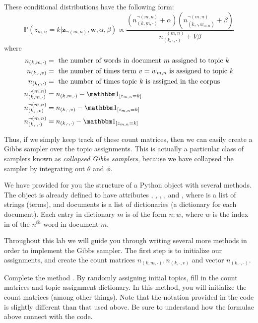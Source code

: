 These conditional distributions have the following form:
\begin{equation*}
\mathbb{P}(z_{m,n} = k | \mathbf{z}_{\neg (m,n)}, \mathbf{w}, \alpha, \beta) \propto \frac{(n_{(k,m,\cdot)}^{\neg (m,n)} + \alpha)(n_{(k, \cdot, w_{m,n})}^{\neg (m,n)} + \beta)}{n_{(k,\cdot,\cdot)}^{\neg (m,n)} + V \beta}
\end{equation*}
where
\begin{align*}
n_{(k,m,\cdot)} & = \mbox{ the number of words in document $m$ assigned to topic $k$} \\
n_{(k,\cdot,v)} & = \mbox{ the number of times term $v = w_{m,n}$ is assigned to topic $k$} \\
n_{(k,\cdot,\cdot)} & = \mbox{ the number of times topic $k$ is assigned in the corpus} \\
n_{(k,m,\cdot)}^{\neg (m,n)} & = n_{(k,m,\cdot)} - \indicator{z_{m,n} = k} \\
n_{(k,\cdot,v)}^{\neg (m,n)} & = n_{(k,\cdot,v)} - \indicator{z_{m,n} = k} \\
n_{(k,\cdot,\cdot)}^{\neg (m,n)} & = n_{(k,\cdot,\cdot)} - \indicator{z_{m,n} = k}
\end{align*}

Thus, if we simply keep track of these count matrices, then we can easily create a Gibbs sampler over the topic assignments. This is actually a particular class of samplers known as \emph{collapsed Gibbs samplers}, because we have collapsed the sampler by integrating out $\theta$ and $\phi$.

We have provided for you the structure of a Python object  with several methods. The object is already defined to have attributes , , , , and , where  is a list of strings (terms), and documents is a list of dictionaries (a dictionary for each document). Each entry in dictionary $m$ is of the form $n : w$, where $w$ is the index in  of the $n^{th}$ word in document $m$.

Throughout this lab we will guide you through writing several more methods in order to implement the Gibbs sampler. The first step is to initialize our assignments, and create the count matrices $n_{(k,m,\cdot)}, n_{(k,\cdot,v)}$ and vector $n_{(k,\cdot,\cdot)}$.

\begin{problem}
Complete the method . By randomly assigning initial topics, fill in the count matrices and topic assignment dictionary. In this method, you will initialize the count matrices (among other things). Note that the notation
provided in the code is slightly different than that used above. Be sure to understand how the formulae above
connect with the code.
\end{problem}

